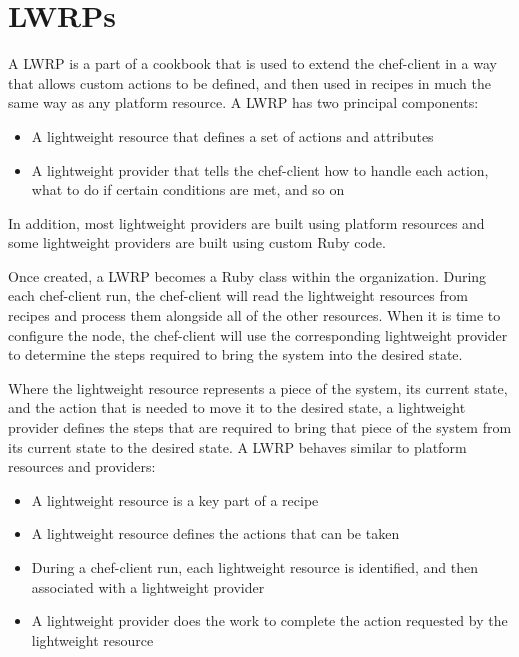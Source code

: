 \section{LWRPs}
\label{sec:cookbook-lwrp}

A LWRP is a part of a cookbook that is used to extend the chef-client in a way that allows custom actions to be defined, and then used in recipes in much the same way as any platform resource. A LWRP has two principal components:

\begin{itemize}
  \item A lightweight resource that defines a set of actions and attributes
  \item A lightweight provider that tells the chef-client how to handle each action, what to do if certain conditions are met, and so on
\end{itemize}

In addition, most lightweight providers are built using platform resources and some lightweight providers are built using custom Ruby code.

Once created, a LWRP becomes a Ruby class within the organization. During each chef-client run, the chef-client will read the lightweight resources from recipes and process them alongside all of the other resources. When it is time to configure the node, the chef-client will use the corresponding lightweight provider to determine the steps required to bring the system into the desired state.

Where the lightweight resource represents a piece of the system, its current state, and the action that is needed to move it to the desired state, a lightweight provider defines the steps that are required to bring that piece of the system from its current state to the desired state. A LWRP behaves similar to platform resources and providers:

\begin{itemize}
  \item A lightweight resource is a key part of a recipe
  \item A lightweight resource defines the actions that can be taken
  \item During a chef-client run, each lightweight resource is identified, and then associated with a lightweight provider
  \item A lightweight provider does the work to complete the action requested by the lightweight resource
\end{itemize}


